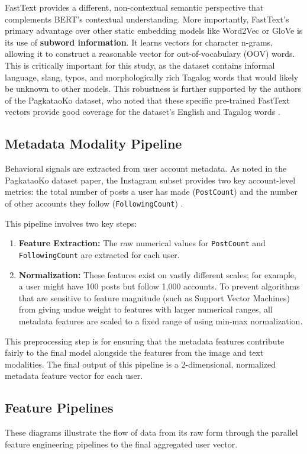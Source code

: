 FastText provides a different, non-contextual semantic perspective that complements BERT's contextual understanding. More importantly, FastText's primary advantage over other static embedding models like Word2Vec or GloVe is its use of \textbf{subword information}. It learns vectors for character n-grams, allowing it to construct a reasonable vector for out-of-vocabulary (OOV) words. This is critically important for this study, as the dataset contains informal language, slang, typos, and morphologically rich Tagalog words that would likely be unknown to other models. This robustness is further supported by the authors of the PagkataoKo dataset, who noted that these specific pre-trained FastText vectors provide good coverage for the dataset's English and Tagalog words \citep{tighe_acorda_2022}.

\subsection{Metadata Modality Pipeline}
Behavioral signals are extracted from user account metadata. As noted in the PagkataoKo dataset paper, the Instagram subset provides two key account-level metrics: the total number of posts a user has made (\texttt{PostCount}) and the number of other accounts they follow (\texttt{FollowingCount}) \citep{tighe_acorda_2022}.

This pipeline involves two key steps:
\begin{enumerate}
	\item \textbf{Feature Extraction:} The raw numerical values for \texttt{PostCount} and \texttt{FollowingCount} are extracted for each user.
	\item \textbf{Normalization:} These features exist on vastly different scales; for example, a user might have 100 posts but follow 1,000 accounts. To prevent algorithms that are sensitive to feature magnitude (such as Support Vector Machines) from giving undue weight to features with larger numerical ranges, all metadata features are scaled to a fixed range of  using min-max normalization.
\end{enumerate}
This preprocessing step is for ensuring that the metadata features contribute fairly to the final model alongside the features from the image and text modalities. The final output of this pipeline is a 2-dimensional, normalized metadata feature vector for each user.

\subsection{Feature Pipelines}
These diagrams illustrate the flow of data from its raw form through the parallel feature engineering pipelines to the final aggregated user vector. 

